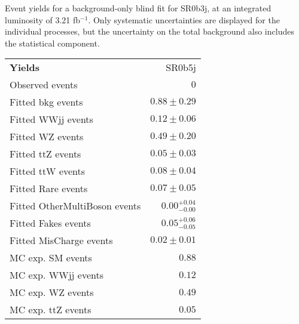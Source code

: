 \begin{table}
\begin{center}
\end{center}

\caption{Event yields for a background-only blind fit for SR0b3j, at an integrated luminosity of 3.21 fb$^{-1}$. Only systematic uncertainties are displayed for the individual processes, but the uncertainty on the total background also includes the statistical component. }
\label{tab:histfitter:yields:bgonly:SR0b3j}
\end{table}


\begin{table}
\begin{center}
\setlength{\tabcolsep}{0.0pc}
{\small
\begin{tabular*}{\textwidth}{@{\extracolsep{\fill}}lr}
\noalign{\smallskip}\hline\noalign{\smallskip}
{\bf Yields}           & SR0b5j              \\[-0.05cm]
\noalign{\smallskip}\hline\noalign{\smallskip}
Observed events          & $0$                    \\
\noalign{\smallskip}\hline\noalign{\smallskip}
Fitted bkg events         & $0.88 \pm 0.29$              \\
\noalign{\smallskip}\hline\noalign{\smallskip}
        Fitted WWjj events         & $0.12 \pm 0.06$              \\
        Fitted WZ events         & $0.49 \pm 0.20$              \\
        Fitted ttZ events         & $0.05 \pm 0.03$              \\
        Fitted ttW events         & $0.08 \pm 0.04$              \\
        Fitted Rare events         & $0.07 \pm 0.05$              \\
        Fitted OtherMultiBoson events         & $0.00_{-0.00}^{+0.04}$              \\
        Fitted Fakes events         & $0.05_{-0.05}^{+0.06}$              \\
        Fitted MisCharge events         & $0.02 \pm 0.01$              \\
 \noalign{\smallskip}\hline\noalign{\smallskip}
MC exp. SM events              & $0.88$              \\
\noalign{\smallskip}\hline\noalign{\smallskip}
        MC exp. WWjj events         & $0.12$              \\
        MC exp. WZ events         & $0.49$              \\
        MC exp. ttZ events         & $0.05$              \\

\end{tabular*}}
\end{center}
\end{table}
